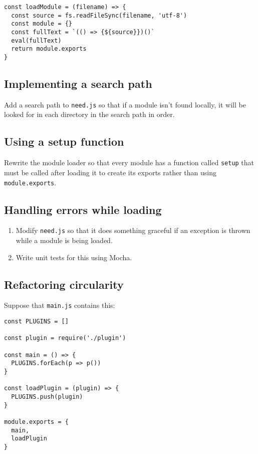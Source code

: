 \documentclass[krantzl]{krantz}
\begin{document}
\begin{lstlisting}[frame=single,frameround=tttt]
const loadModule = (filename) => {
  const source = fs.readFileSync(filename, 'utf-8')
  const module = {}
  const fullText = `(() => {${source}})()`
  eval(fullText)
  return module.exports
}
\end{lstlisting}

\subsection*{Implementing a search path}


Add a search path to \texttt{need.js} so that if a module isn't found locally,
it will be looked for in each directory in the search path in order.

\subsection*{Using a setup function}


Rewrite the module loader so that every module has a function called \texttt{setup}
that must be called after loading it to create its exports
rather than using \texttt{module.exports}.

\subsection*{Handling errors while loading}

\begin{enumerate}

\item 

Modify \texttt{need.js} so that it does something graceful
    if an exception is thrown while a module is being loaded.



\item 

Write unit tests for this using Mocha.



\end{enumerate}

\subsection*{Refactoring circularity}


Suppose that \texttt{main.js} contains this:


\begin{lstlisting}[frame=single,frameround=tttt]
const PLUGINS = []

const plugin = require('./plugin')

const main = () => {
  PLUGINS.forEach(p => p())
}

const loadPlugin = (plugin) => {
  PLUGINS.push(plugin)
}

module.exports = {
  main,
  loadPlugin
}
\end{lstlisting}
\end{document}
